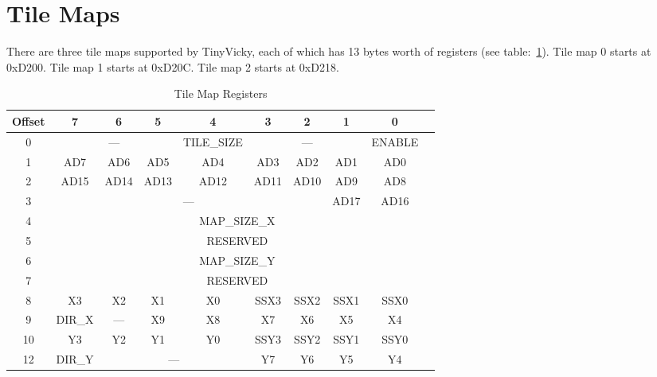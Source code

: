 \section{Tile Maps}

There are three tile maps supported by TinyVicky, each of which has 13 bytes worth of registers (see table:~\ref{tab:tilemap_reg}). Tile map 0 starts at 0xD200. Tile map 1 starts at 0xD20C. Tile map 2 starts at 0xD218.

\begin{table}[h]
    \begin{center}
        \begin{tabular}{|c|c|c|c|c|c|c|c|c|c|} \hline
            Offset & 7 & 6 & 5 & 4 & 3 & 2 & 1 & 0 \\ \hline
            0 & \multicolumn{3}{|c|}{---} & TILE\_SIZE & \multicolumn{3}{|c|}{---} & ENABLE \\ \hline
            1 & AD7 & AD6 & AD5 & AD4 & AD3 & AD2 & AD1 & AD0 \\ \hline
            2 & AD15 & AD14 & AD13 & AD12 & AD11 & AD10 & AD9 & AD8 \\ \hline
            3 & \multicolumn{6}{|c|}{---} & AD17 & AD16 \\ \hline
            4 & \multicolumn{8}{|c|}{MAP\_SIZE\_X} \\ \hline
            5 & \multicolumn{8}{|c|}{RESERVED} \\ \hline
            6 & \multicolumn{8}{|c|}{MAP\_SIZE\_Y} \\ \hline
            7 & \multicolumn{8}{|c|}{RESERVED} \\ \hline
            8 & X3 & X2 & X1 & X0 & SSX3 & SSX2 & SSX1 & SSX0 \\ \hline
            9 & DIR\_X & --- & X9 & X8 & X7 & X6 & X5 & X4 \\ \hline
            10 & Y3 & Y2 & Y1 & Y0 & SSY3 & SSY2 & SSY1 & SSY0 \\ \hline
            12 & DIR\_Y &\multicolumn{3}{|c|}{---} & Y7 & Y6 & Y5 & Y4 \\ \hline
        \end{tabular}
    \end{center}
    \caption{Tile Map Registers}
    \label{tab:tilemap_reg}
\end{table}

